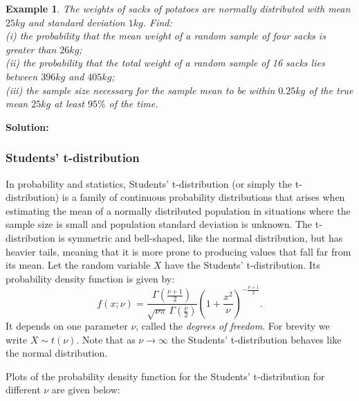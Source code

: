 \documentclass[12pt]{article}
\theoremstyle{break}
\newtheorem{example}[theorem]{Example}
\begin{document}
\begin{example}
The weights of sacks of potatoes are normally distributed with mean $25kg$ and standard deviation $1kg$. Find:\\
(i) the probability that the mean weight of a random sample of four sacks is greater than $26kg$;\\
(ii) the probability that the total weight of a random sample of 16 sacks lies between $396kg$ and $405kg$;\\
(iii) the sample size necessary for the sample mean to be within $0.25kg$ of the true mean $25kg$ at least $95\%$ of the time.
\end{example}
\begin{mdframed}
{\bf Solution:}
\textcolor[rgb]{1.00,1.00,1.00}{\lipsum[1-6]}
\end{mdframed}


\subsubsection{Students' t-distribution}
In probability and statistics, Students' t-distribution (or simply the t-distribution) is a family of continuous probability distributions that arises when estimating the mean of a normally distributed population in situations where the sample size is small and population standard deviation is unknown. The t-distribution is symmetric and bell-shaped, like the normal distribution, but has heavier tails, meaning that it is more prone to producing values that fall far from its mean. Let the random variable $X$ have the Students' t-distribution. Its probability density function is given by:
$$f(x;\nu) = \frac{\Gamma(\frac{\nu+1}{2})} {\sqrt{\nu\pi}\,\Gamma(\frac{\nu}{2})} \left(1+\frac{x^2}{\nu} \right)^{-\frac{\nu+1}{2}}.$$
It depends on one parameter $\nu$, called the \emph{degrees of freedom}. For brevity we write $X \sim t(\nu)$.
Note that as $\nu \rightarrow \infty$ the Students' t-distribution behaves like the normal distribution.

Plots of the probability density function for the Students' t-distribution for different $\nu$ are given below:

\end{document}
